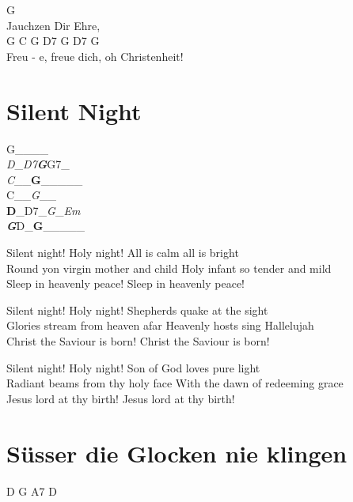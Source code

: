 \documentclass[
  letterpaper,
]{scrbook}
\begin{document}
G\\
Jauchzen Dir Ehre,\\
G C G D7 G D7 G\\
Freu - e, freue dich, oh Christenheit!

\hypertarget{silent-night}{%
\chapter{Silent Night}\label{silent-night}}

G\_\textbf{\textbar{}}\_\emph{\textbar{}}\_\textbf{\textbar{}}\_\emph{\textbar{}\\
D}\_\emph{\textbar D7\textbf{\textbar G}}\textbar G7\_\emph{\textbar{}\\
C}\_\emph{\textbar{}}\_\textbf{\textbar G}\_\textbar\_\_\_\_\textbar{}\\
C\_\textbf{\textbar{}}\_\emph{\textbar G}\_\emph{\textbar{}}\_\textbf{\textbar{}\\
D}\_\textbar D7\_\emph{\textbar G}\_\emph{\textbar Em\textbf{\textbar{}\\
G}}\textbar D\_\textbf{\textbar G}\_\textbar\_\_\_\_\textbar{}

Silent night! Holy night! All is calm all is bright\\
Round yon virgin mother and child Holy infant so tender and mild\\
Sleep in heavenly peace! Sleep in heavenly peace!

Silent night! Holy night! Shepherds quake at the sight\\
Glories stream from heaven afar Heavenly hosts sing Hallelujah\\
Christ the Saviour is born! Christ the Saviour is born!

Silent night! Holy night! Son of God love\textquotesingle s pure light\\
Radiant beams from thy holy face With the dawn of redeeming grace\\
Jesus lord at thy birth! Jesus lord at thy birth!

\hypertarget{suxfcsser-die-glocken-nie-klingen}{%
\chapter{Süsser die Glocken nie
klingen}\label{suxfcsser-die-glocken-nie-klingen}}

D G A7 D
\end{document}
